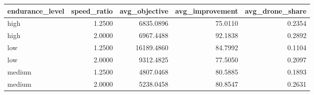 \begin{tabular}{lrrrr}
\toprule
endurance_level & speed_ratio & avg_objective & avg_improvement & avg_drone_share \\
\midrule
high & 1.2500 & 6835.0896 & 75.0110 & 0.2354 \\
high & 2.0000 & 6967.4488 & 92.1838 & 0.2892 \\
low & 1.2500 & 16189.4860 & 84.7992 & 0.1104 \\
low & 2.0000 & 9312.4825 & 77.5050 & 0.2097 \\
medium & 1.2500 & 4807.0468 & 80.5885 & 0.1893 \\
medium & 2.0000 & 5238.0458 & 80.8547 & 0.2631 \\
\bottomrule
\end{tabular}
